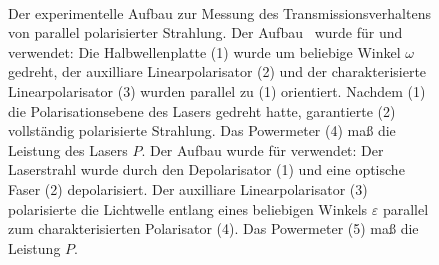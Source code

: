 \documentclass[a4paper,12pt,twoside,parskip=no,headsepline,open=right,ngerman,export]{scrreprt}
\begin{document}
            \begin{figure}[!b]
                \centering
                \\
                \caption[Transmissionsgrad von parallel polarisierten Licht]{Der experimentelle Aufbau zur Messung des Transmissionsverhaltens von parallel polarisierter Strahlung. 
                Der Aufbau~ wurde für  und  verwendet: Die Halbwellenplatte (1) wurde um beliebige Winkel $\omega$ gedreht, der auxilliare Linearpolarisator (2) und der charakterisierte Linearpolarisator (3) wurden parallel zu (1) orientiert. Nachdem (1) die Polarisationsebene des Lasers gedreht hatte, garantierte (2) vollständig polarisierte Strahlung. Das Powermeter (4) maß die Leistung des Lasers $P$. 
                Der Aufbau  wurde für  verwendet: Der Laserstrahl wurde durch den Depolarisator (1) und eine optische Faser (2) depolarisiert. Der auxilliare Linearpolarisator (3) polarisierte die Lichtwelle entlang eines beliebigen Winkels $\varepsilon$ parallel zum charakterisierten Polarisator (4). Das Powermeter (5) maß die Leistung $P$.}
                \label{fig:method_transmissionPolarisator}
            \end{figure}
\end{document}
